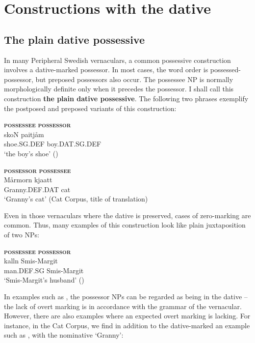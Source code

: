 \section{Constructions with the dative}
\label{bkm:Ref136427895}\subsection{The plain dative possessive}

In many Peripheral Swedish vernaculars, a common possessive construction involves a dative-marked possessor. In most cases, the word order is possessed-possessor, but preposed possessors also occur. The possessee NP is normally morphologically definite only when it precedes the possessor. I shall call this construction \textbf{the plain dative possessive}. The following two phrases exemplify the postposed and preposed variants of this construction:

\renewcommand{\eachwordone}{\scshape}
\renewcommand{\eachwordtwo}{\itshape}

\ea\label{}
	\glll \textbf{\textsc{possessee}} \textbf{\textsc{possessor}} \\
	skoN  paitjåm  \\
	shoe.SG.DEF  boy.DAT.SG.DEF  \\
	\glt ‘the boy’s shoe’ (\citet[22]{Marklund1976})
\z

\ea\label{}
	\glll \textbf{\textsc{possessor}} \textbf{\textsc{possessee}} \\
	Mårmorn  kjaatt\\
	Granny.DEF.DAT  cat\\
\glt ‘Granny’s cat’ (Cat Corpus, title of translation)
\z

Even in those vernaculars where the dative is preserved, cases of zero-marking are common. Thus, many examples of this construction look like plain juxtaposition of two NPs:

\ea\label{}
	\glll \textbf{\textsc{possessee}} \textbf{\textsc{possessor}} \\
	kalln  Smis-Margit \\
	man.DEF.SG  Smis-Margit\\
\glt ‘Smis-Margit’s husband’ (\citet[97]{Levander1909})
\z

In examples such as , the possessor NPs can be regarded as being in the dative – the lack of overt marking is in accordance with the grammar of the vernacular. However, there are also examples where an expected overt marking is lacking. For instance, in the Cat Corpus, we find in addition to the dative-marked  an example such as , with the nominative  ‘Granny’: 

